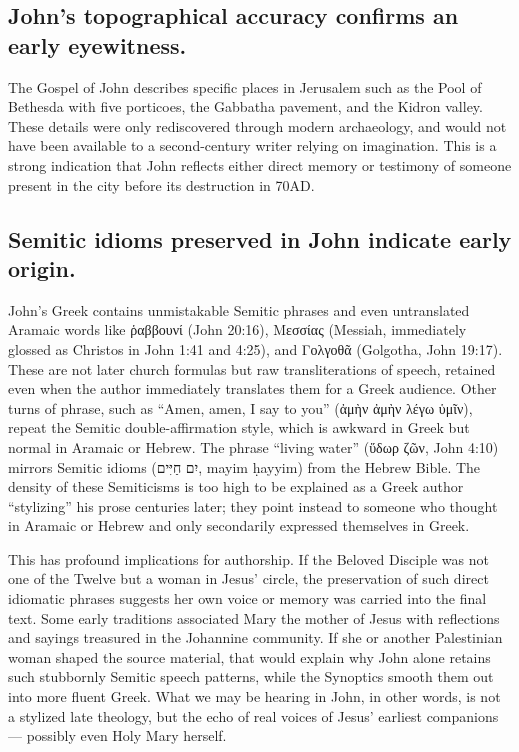 \subsection{John’s topographical accuracy confirms an early eyewitness.}\label{subsec:johns-topographical-accuracy-confirms-an-early-eyewitness.}

The Gospel of John describes specific places in Jerusalem such as the Pool of Bethesda with five porticoes, the Gabbatha pavement, and the Kidron valley.
These details were only rediscovered through modern archaeology, and would not have been available to a second-century writer relying on imagination.
This is a strong indication that John reflects either direct memory or testimony of someone present in the city before its destruction in 70AD.

\subsection{Semitic idioms preserved in John indicate early origin.}\label{subsec:semitic-idioms-preserved-in-john-indicate-early-origin.}

John’s Greek contains unmistakable Semitic phrases and even untranslated Aramaic words like ῥαββουνί (John 20:16), Μεσσίας (Messiah, immediately glossed as Christos in John 1:41 and 4:25), and Γολγοθᾶ (Golgotha, John 19:17).
These are not later church formulas but raw transliterations of speech, retained even when the author immediately translates them for a Greek audience.
Other turns of phrase, such as “Amen, amen, I say to you” (ἀμὴν ἀμὴν λέγω ὑμῖν), repeat the Semitic double-affirmation style, which is awkward in Greek but normal in Aramaic or Hebrew.
The phrase “living water” (ὕδωρ ζῶν, John 4:10) mirrors Semitic idioms (\texthebrew{יִם חַיִּים}, mayim ḥayyim) from the Hebrew Bible.
The density of these Semiticisms is too high to be explained as a Greek author “stylizing” his prose centuries later; they point instead to someone who thought in Aramaic or Hebrew and only secondarily expressed themselves in Greek.

This has profound implications for authorship.
If the Beloved Disciple was not one of the Twelve but a woman in Jesus’ circle, the preservation of such direct idiomatic phrases suggests her own voice or memory was carried into the final text.
Some early traditions associated Mary the mother of Jesus with reflections and sayings treasured in the Johannine community.
If she or another Palestinian woman shaped the source material, that would explain why John alone retains such stubbornly Semitic speech patterns, while the Synoptics smooth them out into more fluent Greek.
What we may be hearing in John, in other words, is not a stylized late theology, but the echo of real voices of Jesus’ earliest companions --- possibly even Holy Mary herself.

